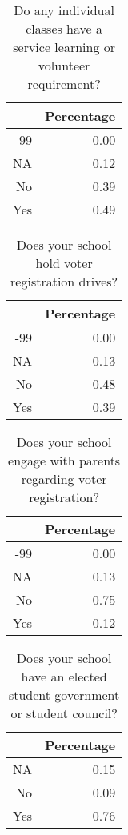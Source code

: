 \documentclass[12pt]{article}
\begin{document}
\begin{table}[ht]
\caption {Do any individual classes have a service learning or volunteer requirement?}
\centering
\begin{tabular}{rr}
  \hline
 & Percentage \\ 
  \hline
-99 & 0.00 \\ 
  NA & 0.12 \\ 
  No & 0.39 \\ 
  Yes & 0.49 \\ 
   \hline
\end{tabular}
\end{table}

\begin{table}[ht]
\caption {Does your school hold voter registration drives?}
\centering
\begin{tabular}{rr}
  \hline
 & Percentage \\ 
  \hline
-99 & 0.00 \\ 
  NA & 0.13 \\ 
  No & 0.48 \\ 
  Yes & 0.39 \\ 
   \hline
\end{tabular}
\end{table}

\begin{table}[ht]
\caption {Does your school engage with parents regarding voter registration?}
\centering
\begin{tabular}{rr}
  \hline
 & Percentage \\ 
  \hline
-99 & 0.00 \\ 
  NA & 0.13 \\ 
  No & 0.75 \\ 
  Yes & 0.12 \\ 
   \hline
\end{tabular}
\end{table}

\begin{table}[ht]
\caption { Does your school have an elected student government or student council?}
\centering
\begin{tabular}{rr}
  \hline
 & Percentage \\ 
  \hline
NA & 0.15 \\ 
  No & 0.09 \\ 
  Yes & 0.76 \\ 
   \hline
\end{tabular}
\end{table}
\end{document}
